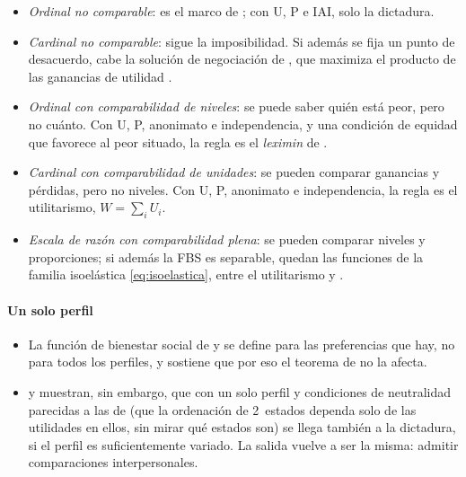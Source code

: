 \documentclass[11pt]{article}
\begin{document}
\begin{itemize}
\item \emph{Ordinal no comparable}: es el marco de ; con U, P e IAI, solo la dictadura\nocite{Arrow1951Social}.
\item \emph{Cardinal no comparable}: sigue la imposibilidad\nocite{Sen1970Collective}. Si además se fija un punto de desacuerdo, cabe la solución de negociación de , que maximiza el producto de las ganancias de utilidad\nocite{Gaertner2006Primer} .
\item \emph{Ordinal con comparabilidad de niveles}: se puede saber quién está peor, pero no cuánto. Con U, P, anonimato e independencia, y una condición de equidad que favorece al peor situado, la regla es el \emph{leximin} de \nocite{Hammond1976Equity,dAspremontGevers1977Equity}.
\item \emph{Cardinal con comparabilidad de unidades}: se pueden comparar ganancias y pérdidas, pero no niveles. Con U, P, anonimato e independencia, la regla es el utilitarismo, $W=\sum_iU_i$\nocite{dAspremontGevers1977Equity}.
\item \emph{Escala de razón con comparabilidad plena}: se pueden comparar niveles y proporciones; si además la FBS es separable, quedan las funciones de la familia isoelástica \eqref{eq:isoelastica}, entre el utilitarismo y \nocite{Roberts1980Interpersonal,BlackorbyDonaldson1982Ratio}.
\end{itemize}

\paragraph{Un solo perfil}

\begin{itemize}
\item La función de bienestar social de  y  se define para las preferencias que hay, no para todos los perfiles, y \textcite{Samuelson1977Reaffirming} sostiene que por eso el teorema de  no la afecta.
\item \textcite{KempNg1976Existence} y \textcite{Parks1976Impossibility} muestran, sin embargo, que con un solo perfil y condiciones de neutralidad parecidas a las de  (que la ordenación de 2~estados dependa solo de las utilidades en ellos, sin mirar qué estados son) se llega también a la dictadura, si el perfil es suficientemente variado. La salida vuelve a ser la misma: admitir comparaciones interpersonales.
\end{itemize}
\end{document}
